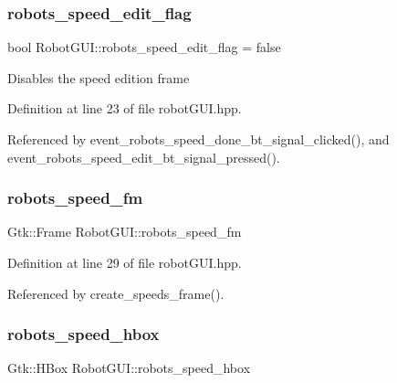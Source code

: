 \subsubsection{\texorpdfstring{robots\+\_\+speed\+\_\+edit\+\_\+flag}{robots\_speed\_edit\_flag}}
{\footnotesize\ttfamily bool Robot\+G\+U\+I\+::robots\+\_\+speed\+\_\+edit\+\_\+flag = false\hspace{0.3cm}{\ttfamily [private]}}

Disables the speed edition frame 

Definition at line 23 of file robot\+G\+U\+I.\+hpp.



Referenced by event\+\_\+robots\+\_\+speed\+\_\+done\+\_\+bt\+\_\+signal\+\_\+clicked(), and event\+\_\+robots\+\_\+speed\+\_\+edit\+\_\+bt\+\_\+signal\+\_\+pressed().

\mbox{\label{class_robot_g_u_i_a13eebe1d64530f8cb3454f78589bb4ce}} 
\subsubsection{\texorpdfstring{robots\+\_\+speed\+\_\+fm}{robots\_speed\_fm}}
{\footnotesize\ttfamily Gtk\+::\+Frame Robot\+G\+U\+I\+::robots\+\_\+speed\+\_\+fm\hspace{0.3cm}{\ttfamily [private]}}



Definition at line 29 of file robot\+G\+U\+I.\+hpp.



Referenced by create\+\_\+speeds\+\_\+frame().

\mbox{\label{class_robot_g_u_i_a6723822512ce408ab5c3f4c27d335363}} 
\subsubsection{\texorpdfstring{robots\+\_\+speed\+\_\+hbox}{robots\_speed\_hbox}}
{\footnotesize\ttfamily Gtk\+::\+H\+Box Robot\+G\+U\+I\+::robots\+\_\+speed\+\_\+hbox\hspace{0.3cm}{\ttfamily [private]}}

